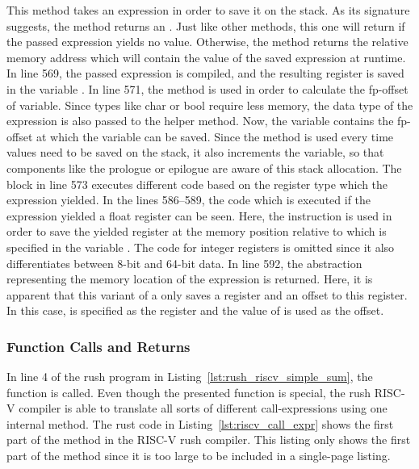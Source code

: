 This method takes an expression in order to save it on the stack.
As its signature suggests, the method returns an .
Just like other methods, this one will return  if the passed expression yields no value.
Otherwise, the method returns the relative memory address which will contain the value of the saved expression at runtime.
In line 569, the passed expression is compiled, and the resulting register is saved in the variable .
In line 571, the  method is used in order to calculate the fp-offset of variable.
Since types like char or bool require less memory, the data type of the expression is also passed to the helper method.
Now, the  variable contains the fp-offset at which the variable can be saved.
Since the  method is used every time values need to be saved on the stack,
it also increments the  variable, so that components like the prologue or epilogue are aware of this stack allocation.
The  block in line 573 executes different code based on the register type which the expression yielded.
In the lines 586--589, the code which is executed if the expression yielded a float register can be seen.
Here, the  instruction is used in order to save the yielded register at the memory position relative to  which is specified in the variable .
The code for integer registers is omitted since it also differentiates between 8-bit and 64-bit data.
In line 592, the  abstraction representing the memory location of the expression is returned.
Here, it is apparent that this variant of a  only saves a register and an offset to this register.
In this case,  is specified as the register and the value of  is used as the offset.

\subsubsection{Function Calls and Returns}

In line 4 of the rush program in Listing~\ref{lst:rush_riscv_simple_sum}, the  function is called.
Even though the presented  function is special, the rush RISC-V compiler is able to translate all sorts of different call-expressions using one internal method.
The rust code in Listing~\ref{lst:riscv_call_expr} shows the first part of the  method in the RISC-V rush compiler.
This listing only shows the first part of the method since it is too large to be included in a single-page listing.

